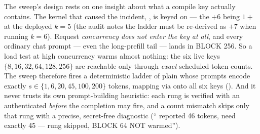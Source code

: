 The sweep's design rests on one insight about what a compile key actually
contains. The kernel that caused the 
incident, , is keyed on
 --- the $+6$
being $1+{}$ at the deployed $k{=}5$ (the audit
notes the ladder must be re-derived as $+7$ when running $k{=}6$). Request
\emph{concurrency does not enter the key at all}, and every ordinary chat
prompt --- even the long-prefill tail --- lands in BLOCK 256. So a load test at
high concurrency warms almost nothing: the six live keys
$\{8,16,32,64,128,256\}$ are reachable only through \emph{exact}
scheduled-token counts. The sweep therefore fires a deterministic ladder of
plain  whose prompts encode exactly
$s \in \{1, 6, 20, 45, 100, 200\}$ tokens, mapping via
 onto all six keys (). And it never trusts its own
prompt-building heuristic: each rung is verified with an authenticated
 \emph{before} the completion may fire, and a count
mismatch skips only that rung with a precise, secret-free diagnostic
(`` reported 46 tokens, need exactly 45 --- rung skipped,
BLOCK 64 NOT warmed'').

